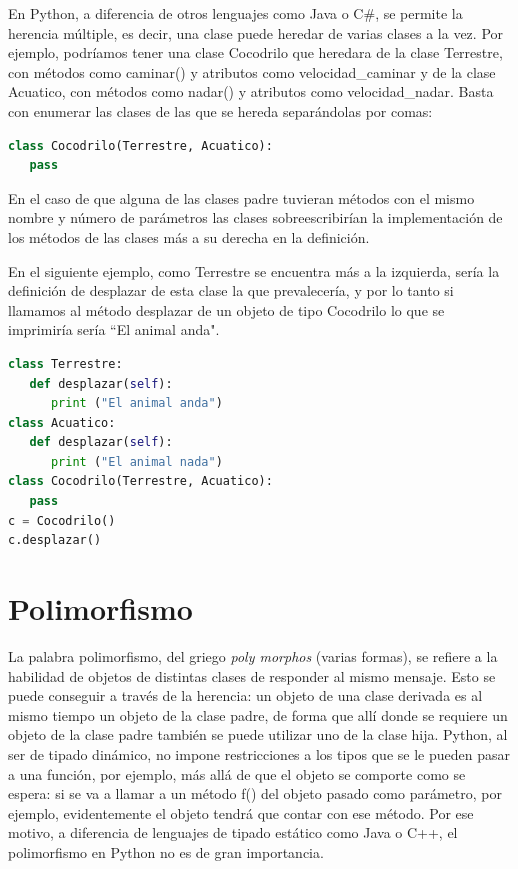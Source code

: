 \documentclass[12pt, twoside]{report}
\begin{document}
En Python, a diferencia de otros lenguajes como Java o C\#, se permite la herencia múltiple, es decir, una clase puede heredar de varias clases a la vez. Por ejemplo, podríamos tener una clase Cocodrilo que heredara de la clase Terrestre, con métodos como caminar() y atributos como velocidad\_caminar y de la clase Acuatico, con métodos como nadar() y atributos como velocidad\_nadar. Basta con enumerar las clases de las que se hereda separándolas por comas:

\begin{lstlisting}[language=Python]
class Cocodrilo(Terrestre, Acuatico):
   pass
\end{lstlisting}

En el caso de que alguna de las clases padre tuvieran métodos con el mismo nombre y número de parámetros las clases sobreescribirían la implementación de los métodos de las clases más a su derecha en la definición.

En el siguiente ejemplo, como Terrestre se encuentra más a la izquierda, sería la definición de desplazar de esta clase la que prevalecería, y por lo tanto si llamamos al método desplazar de un objeto de tipo Cocodrilo lo que se imprimiría sería ``El animal anda".

\begin{lstlisting}[language=Python]
class Terrestre:
   def desplazar(self):
      print ("El animal anda")
class Acuatico:
   def desplazar(self):
      print ("El animal nada")
class Cocodrilo(Terrestre, Acuatico):
   pass
c = Cocodrilo()
c.desplazar()
\end{lstlisting}

\section{Polimorfismo}

La palabra polimorfismo, del griego \textit{poly morphos} (varias formas), se refiere a la habilidad de objetos de distintas clases de responder al mismo mensaje. Esto se puede conseguir a través de la herencia: un objeto de una clase derivada es al mismo tiempo un objeto de la clase padre, de forma que allí donde se requiere un objeto de la clase padre también se puede utilizar uno de la clase hija.
Python, al ser de tipado dinámico, no impone restricciones a los tipos que se le pueden pasar a una función, por ejemplo, más allá de que el objeto se comporte como se espera: si se va a llamar a un método f() del objeto pasado como parámetro, por ejemplo, evidentemente el objeto tendrá que contar con ese método. Por ese motivo, a diferencia de lenguajes de tipado estático como Java o C++, el polimorfismo en Python no es de gran importancia.
\end{document}
